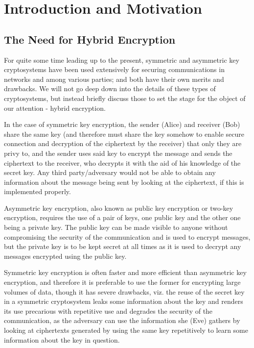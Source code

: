 \newcommand{\symm}{\text{symm}}
\section{Introduction and Motivation}
\subsection{The Need for Hybrid Encryption}
For quite some time leading up to the present, symmetric and asymmetric key cryptosystems have been used extensively for securing communications in networks and among various parties; and both have their own merits and drawbacks. We will not go deep down into the details of these types of cryptosystems, but instead briefly discuss those to set the stage for the object of our attention - hybrid encryption.

In the case of symmetric key encryption, the sender (Alice) and receiver (Bob) share the same key (and therefore must share the key somehow to enable secure connection and decryption of the ciphertext by the receiver) that only they are privy to, and the sender uses said key to encrypt the message and sends the ciphertext to the receiver, who decrypts it with the aid of his knowledge of the secret key. Any third party/adversary would not be able to obtain any information about the message being sent by looking at the ciphertext, if this is implemented properly.\cite{smirnoff_turner_2019}

Asymmetric key encryption, also known as public key encryption or two-key encryption\cite{kaliski_acry}, requires the use of a pair of keys, one public key and the other one being a private key. The public key can be made visible to anyone without compromising the security of the communication and is used to encrypt messages, but the private key is to be kept secret at all times as it is used to decrypt any messages encrypted using the public key.\cite{savvyasym}

Symmetric key encryption is often faster and more efficient than asymmetric key encryption, and therefore it is preferable to use the former for encrypting large volumes of data, though it has severe drawbacks, viz. the reuse of the secret key in a symmetric cryptosystem leaks some information about the key and renders its use precarious with repetitive use and degrades the security of the communication, as the adversary can use the information she (Eve) gathers by looking at ciphertexts generated by using the same key repetitively to learn some information about the key in question.\cite{smirnoff_turner_2019}

